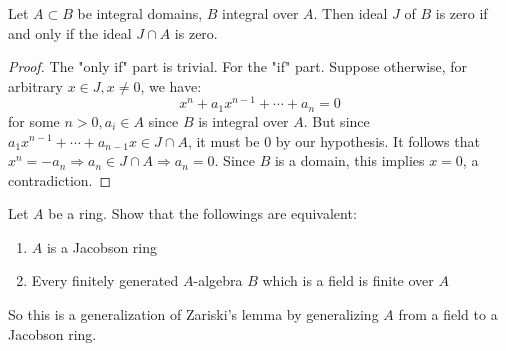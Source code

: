 \documentclass{solution}
\begin{document}
\begin{lemma}
    Let $A \subset B$ be integral domains, $B$ integral over $A$. Then ideal $J$ of $B$ is zero if and only if the ideal $J \cap A$ is zero.
\end{lemma}

\begin{proof}
    The "only if" part is trivial. For the "if" part. Suppose otherwise, for arbitrary $x \in J, x \ne 0$, we have:
    $$x^n + a_1x^{n - 1} + \cdots + a_n = 0$$
    for some $n \gt 0, a_i \in A$ since $B$ is integral over $A$. But since $a_1x^{n - 1} + \cdots + a_{n - 1}x \in J \cap A$, it must be $0$ by our hypothesis. It follows that $x^n = -a_n \Rightarrow a_n \in J \cap A  \Rightarrow a_n = 0$. Since $B$ is a domain, this implies $x = 0$, a contradiction.
\end{proof}

\begin{problem}
    Let $A$ be a ring. Show that the followings are equivalent:
    \begin{enumerate}
        \item $A$ is a Jacobson ring
        \item Every finitely generated $A$-algebra $B$ which is a field is finite over $A$
    \end{enumerate}
\end{problem}

{\color{red} So this is a generalization of Zariski's lemma by generalizing $A$ from a field to a Jacobson ring. }
\end{document}
